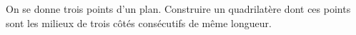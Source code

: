 On se donne trois points d'un plan. Construire un quadrilatère dont ces points sont les milieux de trois côtés consécutifs de même longueur.
